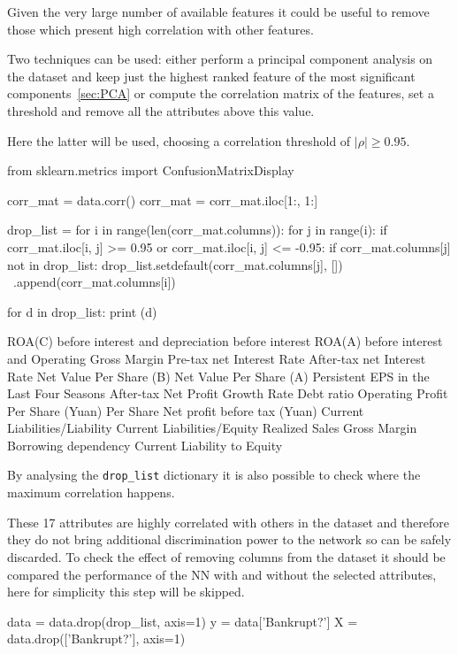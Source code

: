 Given the very large number of available features it could be useful to remove those which present high correlation with other features.

Two techniques can be used: either perform a principal component analysis on the dataset and keep just the highest ranked feature of the most significant components~\ref{sec:PCA} or compute the correlation matrix of the features, set a threshold and remove all the attributes above this value.

Here the latter will be used, choosing a correlation threshold of $|\rho|\geq 0.95$.

\begin{ipython}
from sklearn.metrics import ConfusionMatrixDisplay

corr_mat = data.corr()
corr_mat = corr_mat.iloc[1:, 1:]

drop_list = {}
for i in range(len(corr_mat.columns)):
    for j in range(i):
        if corr_mat.iloc[i, j] >= 0.95 or corr_mat.iloc[i, j] <= -0.95:
            if corr_mat.columns[j] not in drop_list:
                drop_list.setdefault(corr_mat.columns[j], []) \
                         .append(corr_mat.columns[i])
                
for d in drop_list:
    print (d)
\end{ipython}
\begin{ioutput}
ROA(C) before interest and depreciation before interest
ROA(A) before interest and %
Operating Gross Margin
Pre-tax net Interest Rate
After-tax net Interest Rate
Net Value Per Share (B)
Net Value Per Share (A)
Persistent EPS in the Last Four Seasons
After-tax Net Profit Growth Rate
Debt ratio %
Operating Profit Per Share (Yuan)
Per Share Net profit before tax (Yuan)
Current Liabilities/Liability
Current Liabilities/Equity
Realized Sales Gross Margin
Borrowing dependency
Current Liability to Equity
\end{ioutput}
\noindent 
By analysing the \texttt{drop\_list} dictionary it is also possible to check where the maximum correlation happens.

These 17 attributes are highly correlated with others in the dataset and therefore they do not bring additional discrimination power to the network so can be safely discarded. To check the effect of removing columns from the dataset it should be compared the performance of the NN with and without the selected attributes, here for simplicity this step will be skipped.

\begin{ipython}
data = data.drop(drop_list, axis=1)
y = data['Bankrupt?']
X = data.drop(['Bankrupt?'], axis=1)
\end{ipython}

